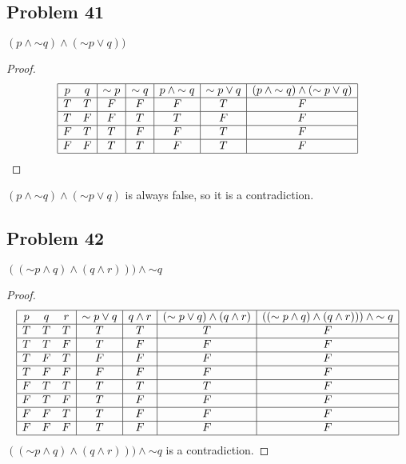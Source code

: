 \documentclass[14pt]{extarticle}
\begin{document}
\subsection{Problem 41}
$(p \wedge {\sim q}) \wedge ({\sim p} \vee q))$

\begin{proof}
$$
\begin{array}{|cc|c|c|c|c|c|}
\hline
p & q & {\sim p} & {\sim q} & p \wedge {\sim q} & {\sim p} \vee q &
(p \wedge {\sim q}) \wedge ({\sim p} \vee q) \\
\hline
T & T & F & F & F & T & F  \\
\hline
T & F & F & T & T & F & F  \\
\hline
F & T & T & F & F & T & F  \\
\hline
F & F & T & T & F & T & F  \\
\hline
\end{array}
$$
\end{proof}
$(p \wedge {\sim q}) \wedge ({\sim p} \vee q)$ is always false, so it is a contradiction.


\subsection{Problem 42}
$(({\sim p} \wedge q) \wedge (q \wedge r))) \wedge {\sim q}$

\begin{proof}
$$
\begin{array}{|ccc|c|c|c|c|}
\hline
p & q & r & {\sim p} \vee q & q \wedge r & ({\sim p} \vee q) \wedge (q \wedge
r)& (({\sim p} \wedge q) \wedge (q \wedge r))) \wedge {\sim q} \\
\hline
T & T & T & T & T & T & F \\
\hline
T & T & F & T & F & F & F \\
\hline
T & F & T & F & F & F & F \\
\hline
T & F & F & F & F & F & F \\
\hline
F & T & T & T & T & T & F \\
\hline
F & T & F & T & F & F & F \\
\hline
F & F & T & T & F & F & F \\
\hline
F & F & F & T & F & F & F \\
\hline
\end{array}
$$
$(({\sim p} \wedge q) \wedge (q \wedge r))) \wedge {\sim q}$ is a contradiction.

\end{proof}
\end{document}
